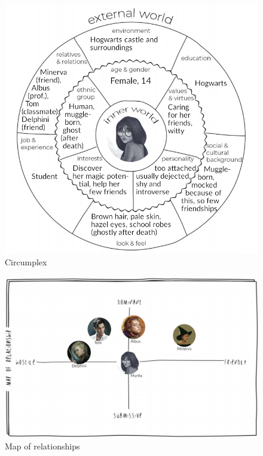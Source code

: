 \begin{figure}[H]
\includegraphics[max width=\textwidth]{../Pictures/Characters/Circumplexes/Myrtle_circumplex.png} 
\captionsetup{labelformat=empty}
\caption{Circumplex}
\end{figure}

\begin{figure}[H]
\includegraphics[max width=\textwidth]{../Pictures/Characters/Relationship_maps/Myrtle_relmap.png} 
\captionsetup{labelformat=empty}
\caption{Map of relationships}
\end{figure}


\clearpage
